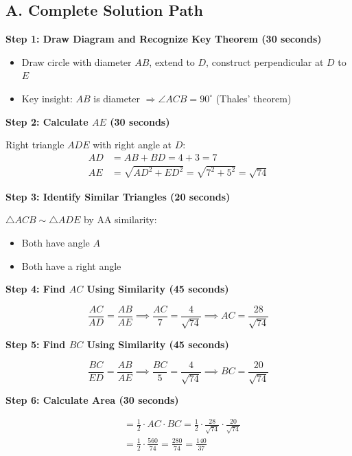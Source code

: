 \documentclass[]{article}
\begin{document}
\begin{solutionbox}
\subsection*{A. Complete Solution Path}

\textbf{Step 1: Draw Diagram and Recognize Key Theorem (30 seconds)}
\begin{itemize}[leftmargin=*]
    \item Draw circle with diameter $AB$, extend to $D$, construct perpendicular at $D$ to $E$
    \item Key insight: $AB$ is diameter $\Rightarrow \angle ACB = 90^\circ$ (Thales' theorem)
\end{itemize}

\textbf{Step 2: Calculate $AE$ (30 seconds)}

Right triangle $ADE$ with right angle at $D$:
\begin{align*}
AD &= AB + BD = 4 + 3 = 7\\
AE &= \sqrt{AD^2 + ED^2} = \sqrt{7^2 + 5^2} = \sqrt{74}
\end{align*}

\textbf{Step 3: Identify Similar Triangles (20 seconds)}

$\triangle ACB \sim \triangle ADE$ by AA similarity:
\begin{itemize}
    \item Both have angle $A$
    \item Both have a right angle
\end{itemize}

\textbf{Step 4: Find $AC$ Using Similarity (45 seconds)}

\[\frac{AC}{AD} = \frac{AB}{AE} \implies \frac{AC}{7} = \frac{4}{\sqrt{74}} \implies AC = \frac{28}{\sqrt{74}}\]

\textbf{Step 5: Find $BC$ Using Similarity (45 seconds)}

\[\frac{BC}{ED} = \frac{AB}{AE} \implies \frac{BC}{5} = \frac{4}{\sqrt{74}} \implies BC = \frac{20}{\sqrt{74}}\]

\textbf{Step 6: Calculate Area (30 seconds)}

\begin{align*}
[\triangle ABC] &= \frac{1}{2} \cdot AC \cdot BC = \frac{1}{2} \cdot \frac{28}{\sqrt{74}} \cdot \frac{20}{\sqrt{74}}\\
&= \frac{1}{2} \cdot \frac{560}{74} = \frac{280}{74} = \frac{140}{37}
\end{align*}


\end{solutionbox}
\end{document}

